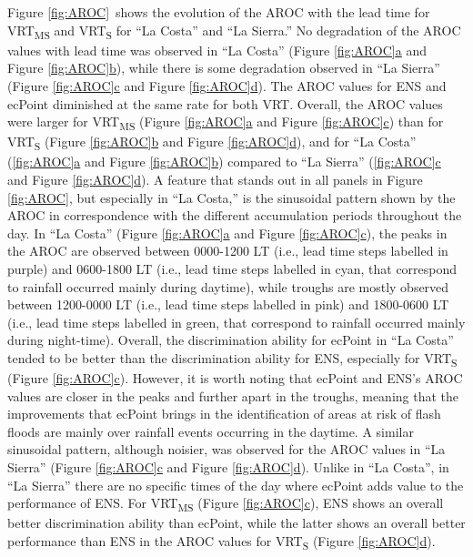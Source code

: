 \documentclass[techmemo]{ecmwfrep}%
\begin{document}
Figure \ref{fig:AROC}\ shows the evolution of the AROC with the lead time for VRT\textsubscript{MS} and VRT\textsubscript{S} for “La Costa” and “La Sierra.” No degradation of the AROC values with lead time was observed in “La Costa” (Figure \ref{fig:AROC}\hyperref[fig:AROC]{a} and Figure \ref{fig:AROC}\hyperref[fig:AROC]{b}), while there is some degradation observed in “La Sierra” (Figure \ref{fig:AROC}\hyperref[fig:AROC]{c} and Figure \ref{fig:AROC}\hyperref[fig:AROC]{d}). The AROC values for ENS and ecPoint diminished at the same rate for both VRT. Overall, the AROC values were larger for VRT\textsubscript{MS} (Figure \ref{fig:AROC}\hyperref[fig:AROC]{a} and Figure \ref{fig:AROC}\hyperref[fig:AROC]{c}) than for VRT\textsubscript{S} (Figure \ref{fig:AROC}\hyperref[fig:AROC]{b} and Figure \ref{fig:AROC}\hyperref[fig:AROC]{d}), and for “La Costa” (\ref{fig:AROC}\hyperref[fig:AROC]{a} and Figure \ref{fig:AROC}\hyperref[fig:AROC]{b}) compared to “La Sierra” (\ref{fig:AROC}\hyperref[fig:AROC]{c} and Figure \ref{fig:AROC}\hyperref[fig:AROC]{d}). A feature that stands out in all panels in Figure \ref{fig:AROC}, but especially in “La Costa,” is the sinusoidal pattern shown by the AROC in correspondence with the different accumulation periods throughout the day. In “La Costa” (Figure \ref{fig:AROC}\hyperref[fig:AROC]{a} and Figure \ref{fig:AROC}\hyperref[fig:AROC]{c}), the peaks in the AROC are observed between 0000-1200 LT (i.e., lead time steps labelled in purple) and 0600-1800 LT (i.e., lead time steps labelled in cyan, that correspond to rainfall occurred mainly during daytime), while troughs are mostly observed between 1200-0000 LT (i.e., lead time steps labelled in pink) and 1800-0600 LT (i.e., lead time steps labelled in green, that correspond to rainfall occurred mainly during night-time). Overall, the discrimination ability for ecPoint in “La Costa” tended to be better than the discrimination ability for ENS, especially for VRT\textsubscript{S} (Figure \ref{fig:AROC}\hyperref[fig:AROC]{c}). However, it is worth noting that ecPoint and ENS’s AROC values are closer in the peaks and further apart in the troughs, meaning that the improvements that ecPoint brings in the identification of areas at risk of flash floods are mainly over rainfall events occurring in the daytime. A similar sinusoidal pattern, although noisier, was observed for the AROC values in “La Sierra” (Figure \ref{fig:AROC}\hyperref[fig:AROC]{c} and Figure \ref{fig:AROC}\hyperref[fig:AROC]{d}). Unlike in “La Costa”, in “La Sierra” there are no specific times of the day where ecPoint adds value to the performance of ENS. For VRT\textsubscript{MS} (Figure \ref{fig:AROC}\hyperref[fig:AROC]{c}), ENS shows an overall better discrimination ability than ecPoint, while the latter shows an overall better performance than ENS in the AROC values for VRT\textsubscript{S} (Figure \ref{fig:AROC}\hyperref[fig:AROC]{d}).
\end{document}
